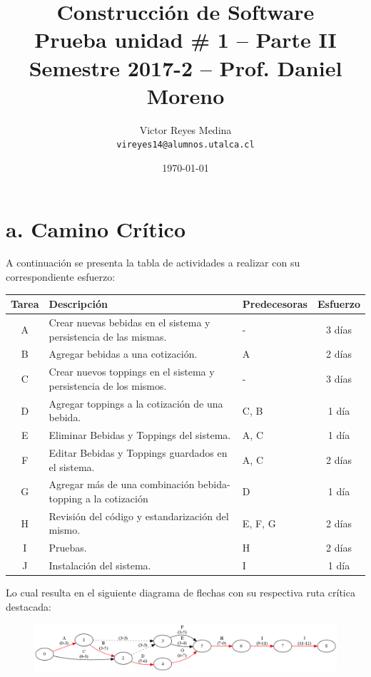 \documentclass[11pt]{utalcaDoc}
\title{{\bf \Large Construcción de Software \\ 
			Prueba unidad \# 1 -- Parte II}\\ 
			{\normalsize Semestre 2017-2 -- Prof. Daniel Moreno}}
\author{
  Victor Reyes Medina\\
  \texttt{vireyes14@alumnos.utalca.cl}
}
\date{\today}
\begin{document}
\renewcommand{\figurename}{Figura~}
\renewcommand{\tablename}{Tabla~}
\renewcommand{\lstlistingname}{Código~}
\renewcommand{\theenumii}{\arabic{enumii}}
\renewcommand{\labelenumii}{%
  \theenumii.
}
\maketitle


\section*{a. Camino Crítico}
A continuación se presenta la tabla de actividades a realizar con su correspondiente esfuerzo:

\begin{tabular}{|c|p{9.5cm}|p{3cm} |c|}
\hline 
\textbf{Tarea} & \textbf{Descripción} & \textbf{Predecesoras} & \textbf{Esfuerzo}\\ 
\hline 
A & Crear nuevas bebidas en el sistema y persistencia de las mismas. & - & 3 días  \\ 
\hline 
B & Agregar bebidas a una cotización. & A & 2 días \\ 
\hline 
C & Crear nuevos toppings en el sistema y persistencia de los mismos. & - & 3 días  \\ 
\hline 
D & Agregar toppings a la cotización de una bebida. & C, B & 1 día  \\ 
\hline 
E & Eliminar Bebidas y Toppings del sistema. & A, C & 1 día  \\ 
\hline 
F & Editar Bebidas y Toppings guardados en el sistema. & A, C & 2 días  \\ 
\hline 
G & Agregar más de una combinación bebida-topping a la cotización & D & 1 día  \\ 
\hline 
H & Revisión del código y estandarización del mismo. & E, F, G & 2 días  \\ 
\hline 
I & Pruebas. & H & 2 días  \\ 
\hline
J & Instalación del sistema. & I & 1 día  \\ 
\hline

\end{tabular} 

Lo cual resulta en el siguiente diagrama de flechas con su respectiva ruta crítica destacada:

\begin{figure}[H]
\includegraphics[scale=0.45]{arrows.png}
\end{figure}
\end{document}
